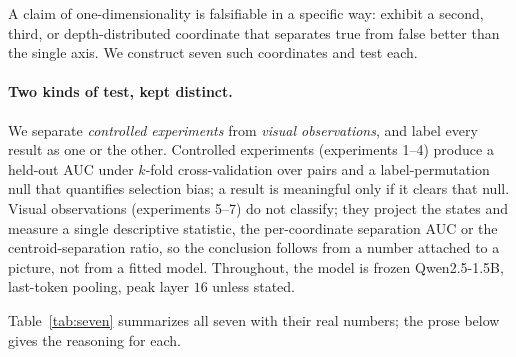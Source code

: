 \documentclass[11pt]{article}
\begin{document}
A claim of one-dimensionality is falsifiable in a specific way: exhibit a
second, third, or depth-distributed coordinate that separates true from false
better than the single axis. We construct seven such coordinates and test
each.

\paragraph{Two kinds of test, kept distinct.} We separate \emph{controlled
experiments} from \emph{visual observations}, and label every result as one
or the other. Controlled experiments (experiments 1--4) produce a held-out
AUC under $k$-fold cross-validation over pairs and a label-permutation null
that quantifies selection bias; a result is meaningful only if it clears that
null. Visual observations (experiments 5--7) do not classify; they project
the states and measure a single descriptive statistic, the per-coordinate
separation AUC or the centroid-separation ratio, so the conclusion follows
from a number attached to a picture, not from a fitted model. Throughout, the
model is frozen Qwen2.5-1.5B, last-token pooling, peak layer $16$ unless
stated.

Table~\ref{tab:seven} summarizes all seven with their real numbers; the prose
below gives the reasoning for each.
\end{document}
